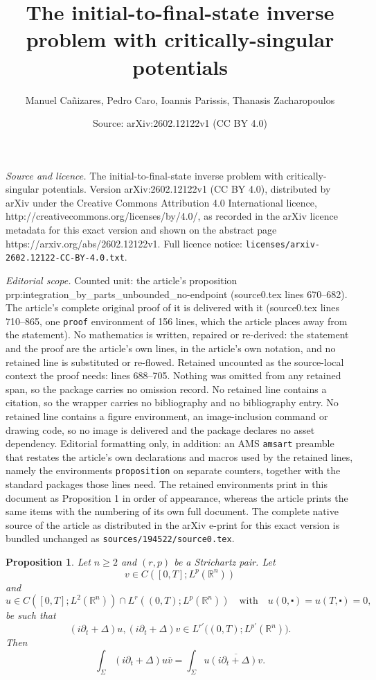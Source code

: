 \documentclass[10pt,a4paper]{amsart}
\title{The initial-to-final-state inverse problem with critically-singular potentials}
\author{Manuel Ca\~nizares, Pedro Caro, Ioannis Parissis, Thanasis Zacharopoulos}
\date{Source: arXiv:2602.12122v1 (CC BY 4.0)}
\newtheorem{proposition}{Proposition}
\newcommand{\R}{\mathbb{R}}
\def\cd{\centerdot}
\def\ovl{\overline}
\begin{document}
\maketitle

\noindent\emph{Source and licence.} The initial-to-final-state inverse problem with critically-singular potentials. Version arXiv:2602.12122v1 (CC BY 4.0), distributed by arXiv under the Creative Commons Attribution 4.0 International licence, http://creativecommons.org/licenses/by/4.0/, as recorded in the arXiv licence metadata for this exact version and shown on the abstract page https://arxiv.org/abs/2602.12122v1. Full licence notice: \texttt{licenses/arxiv-2602.12122-CC-BY-4.0.txt}.\par\smallskip

\noindent\textit{Editorial scope.} Counted unit: the article's proposition prp:integration\_by\_parts\_unbounded\_no-endpoint (source0.tex lines 670--682). The article's complete original proof of it is delivered with it (source0.tex lines 710--865, one \texttt{proof} environment of 156 lines, which the article places away from the statement). No mathematics is written, repaired or re-derived: the statement and the proof are the article's own lines, in the article's own notation, and no retained line is substituted or re-flowed.  Retained uncounted as the source-local context the proof needs: lines 688--705.  Nothing was omitted from any retained span, so the package carries no omission record.  No retained line contains a citation, so the wrapper carries no bibliography and no bibliography entry.  No retained line contains a figure environment, an image-inclusion command or drawing code, so no image is delivered and the package declares no asset dependency.  Editorial formatting only, in addition: an AMS \texttt{amsart} preamble that restates the article's own declarations and macros used by the retained lines, namely the environments \texttt{proposition} on separate counters, together with the standard packages those lines need.  The retained environments print in this document as Proposition 1 in order of appearance, whereas the article prints the same items with the numbering of its own full document.  The complete native source of the article as distributed in the arXiv e-print for this exact version is bundled unchanged as \texttt{sources/194522/source0.tex}.
\begin{proposition}\label{cor:integration_by_parts_unbounded_no-endopint2}\sl
Let $n\geq 2$ and $(r,p)$ be a Strichartz pair. Let
\[
v \in C\left([0,T];L^p(\R^n)\right)
\]
and
\[
u \in C\left([0,T];L^2(\R^n)\right) \cap L^r\left((0,T);L^p(\R^n)\right)\quad\text{with}\quad u(0,\cd)=u(T,\cd)=0,
\]
be such that
\[
\left(i\partial_t+\Delta\right)u, \left(i\partial_t+\Delta\right)v \in L^{r'}\big((0,T);L^{p'}(\R^n)\big).
\]
Then
\[
\int_\Sigma \left(i\partial_t+\Delta\right)u \ovl v = \int_\Sigma u \ovl{\left(i\partial_t+\Delta\right)v}.
\]
\end{proposition}
\end{document}
